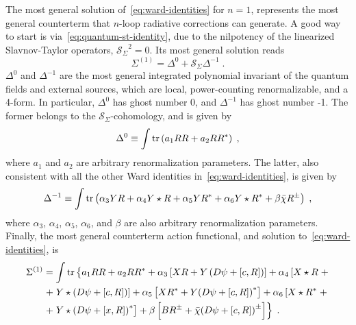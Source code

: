 \documentclass[../main.tex]{subfiles}
\begin{document}
The most general solution of~\eqref{eq:ward-identities} for $n=1$, represents the most general counterterm that $n$-loop radiative corrections can generate. A good way to start is via~\eqref{eq:quantum-st-identity}, due to the nilpotency of the linearized Slavnov-Taylor operators, $ {\mathcal{S}_{\Sigma}}^{ 2 } = 0 $. Its most general solution reads
\begin{equation}
  \label{eq:solution-to-quantum-st}
  \Sigma^{ (1) } = \Delta^0 + \mathcal{S}_{ \Sigma } \Delta^{ -1 }\;.
\end{equation}
$ \Delta^0 $ and $ \Delta^{ -1 } $ are the most general integrated polynomial invariant of the quantum fields and external sources, which are local, power-counting renormalizable, and a 4-form. In particular, $ \Delta^0 $ has ghost number 0, and $ \Delta^{ -1 } $ has ghost number -1. The former belongs to the $ \mathcal{S}_{ \Sigma } $-cohomology, and is given by
\begin{equation}
  \label{eq:delta0}
  \Delta^0 \equiv \int \operatorname{tr} \left( a_1 RR + a_2 RR^* \right) \;,
\end{equation}
where $ a_1 $ and $ a_2 $ are arbitrary renormalization parameters. The latter, also consistent with all the other Ward identities in~\eqref{eq:ward-identities}, is given by
\begin{equation}
  \label{eq:delta-1}
  \Delta^{-1} \equiv \int \operatorname{tr} \left( \alpha_3 Y R + \alpha_4 Y \star R + \alpha_5 Y R^* + \alpha_6 Y \star R^* + \beta \bar{ \chi } R^{\pm} \right) \;,
\end{equation}
where $ \alpha_3 $, $ \alpha_4 $, $ \alpha_5 $, $ \alpha_6 $, and $ \beta $ are also arbitrary renormalization parameters. Finally, the most general counterterm action functional, and solution to~\eqref{eq:ward-identities}, is
\begin{align}
  \label{eq:ct-action}
  \Sigma^{ (1) } & = \int \tr \left\{ \vphantom{^{\pm}} a_1 R R + a_2 R R^* + \alpha_3 \left[ X R + Y \left( D \psi + \left[ c, R \right] \right) \right] + \alpha_4 \left[ X \star R \right. + \right. \nonumber                            \\
                 & \left. + \left. Y \star \left( D \psi + \left[ c, R \right] \right) \right] + \alpha_5 \left[ X R^* + Y {\left( D \psi + \left[ c, R \right] \right)}^* \right] + \alpha_6 \left[ X \star R^* \right. + \right. \nonumber \\
                 & \left. + \left. Y \star {\left( D \psi + \left[ x, R \right] \right)}^* \right] + \beta \left[ BR^{ \pm } + \bar{ \chi } {\left( D \psi + \left[ c, R \right] \right)}^{ \pm }  \right]\right\} \;.
\end{align}
\end{document}

